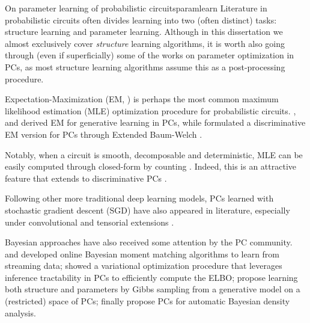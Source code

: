 \begin{remark}[breakable]{On parameter learning of probabilistic circuits}{paramlearn}
  Literature in probabilistic circuits often divides learning into two (often distinct) tasks:
  structure learning and parameter learning. Although in this dissertation we almost exclusively
  cover \emph{structure} learning algorithms, it is worth also going through (even if
  superficially) some of the works on parameter optimization in PCs, as most structure learning
  algorithms assume this as a post-processing procedure.

  Expectation-Maximization (EM, \cite{dempster77}) is perhaps the most common maximum likelihood
  estimation (MLE) optimization procedure for probabilistic circuits. \citet{poon11},
  \citet{peharz15} and \citet{zhao16a} derived EM for generative learning in PCs, while
  \citet{rashwan18a} formulated a discriminative EM version for PCs through Extended Baum-Welch
  \citep{gopalakrishnan91}.

  Notably, when a circuit is smooth, decomposable and deterministic, MLE can be easily computed
  through closed-form by counting \citep{kisa14,peharz14}. Indeed, this is an attractive feature
  that extends to discriminative PCs \citep{liang19}.

  Following other more traditional deep learning models, PCs learned with stochastic gradient
  descent (SGD) have also appeared in literature, especially under convolutional and tensorial
  extensions \citep{sharir18,peharz20a,peharz20b,gens12}.

  Bayesian approaches have also received some attention by the PC community. \citet{jaini16} and
  \citet{rashwan16} developed online Bayesian moment matching algorithms to learn from streaming
  data; \citet{zhao16b} showed a variational optimization procedure that leverages inference
  tractability in PCs to efficiently compute the ELBO; \citet{trapp19} propose learning both
  structure and parameters by Gibbs sampling from a generative model on a (restricted) space of
  PCs; finally \citet{vergari19} propose PCs for automatic Bayesian density analysis.
\end{remark}

\subsection{}
\label{sec:xpcs}


